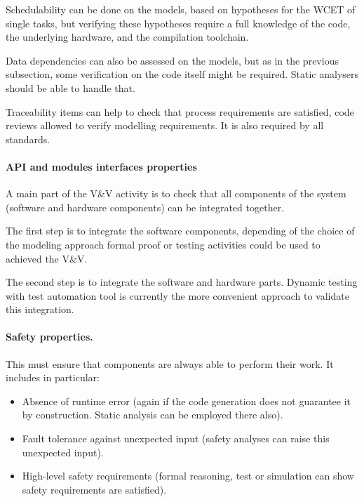 \documentclass{template/openetcs_article}
\begin{document}
Schedulability can be done on the models, based on hypotheses for the WCET of
single tasks, but verifying these hypotheses require a full knowledge of
the code, the underlying hardware, and the compilation toolchain.

Data dependencies can also be assessed on the models, but as in the previous
subsection, some verification on the code itself might be required. Static
analysers should be able to handle that.

Traceability  items can help  to  check  that process requirements are satisfied, code reviews allowed to  verify modelling requirements.  It is also required by all standards.

\paragraph{API and modules interfaces properties}

A main part of the V\&V activity is to check that all components of the system (software and hardware components) can be integrated together.

The first step  is to integrate the software components, depending of the choice of the modeling approach  formal proof or testing activities could be used to achieved the V\&V.

The second step is to  integrate the software and hardware parts. Dynamic
testing with test automation tool  is currently  the more convenient approach  to  validate this integration.


\paragraph{Safety properties.}

This must ensure that components are always able to perform their work.
It includes in particular:
\begin{itemize}
  \item Absence of runtime error (again if the code generation does
        not guarantee it by construction. Static analysis can be employed
        there also).
  \item Fault tolerance against unexpected input (safety analyses can raise this unexpected input).
  \item High-level safety requirements (formal reasoning, test or simulation can show safety requirements are satisfied).
\end{itemize}
\end{document}
